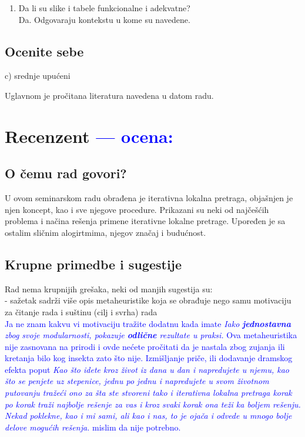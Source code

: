 \documentclass[a4paper]{report}
\newcommand{\odgovor}[1]{\textcolor{blue}{#1}}
\begin{document}
\begin{enumerate}
\item Da li su slike i tabele funkcionalne i adekvatne?\\
Da. Odgovaraju kontekstu u kome su navedene.
\end{enumerate}

\section{Ocenite sebe}
c) srednje upućeni

Uglavnom je pročitana literatura navedena u datom radu.

\chapter{Recenzent \odgovor{--- ocena:} }


\section{O čemu rad govori?}

U ovom seminarskom radu obrađena je iterativna lokalna pretraga, objašnjen je njen koncept, kao i  sve njegove procedure. Prikazani su neki od najčešćih problema i načina rešenja primene iterativne lokalne pretrage. Upoređen je sa ostalim sličnim alogirtmima, njegov značaj i budućnost.

\section{Krupne primedbe i sugestije}

Rad nema krupnijih grešaka, neki od manjih sugestija su:\\
- sažetak sadrži više opis metaheuristike koja se obrađuje nego samu motivaciju za čitanje rada i suštinu (cilj i svrha) rada\\
\odgovor{Ja ne znam kakvu vi motivaciju tražite dodatnu kada imate \textit{Iako \textbf{jednostavna} zbog svoje modularnosti, pokazuje \textbf{odlične} rezultate u praksi.} Ova metaheuristika nije zasnovana na prirodi i ovde nećete pročitati 
da je nastala zbog zujanja ili kretanja bilo kog insekta zato što nije. Izmišljanje priče, ili dodavanje dramskog efekta poput \textit{Kao što idete kroz život iz dana u dan i napredujete u njemu, kao što se penjete uz stepenice, jednu po jednu i napredujete u svom životnom putovanju tražeći ono za šta ste stvoreni tako i iterativna lokalna pretraga korak po korak traži najbolje rešenje za vas i kroz 
svaki korak ona teži ka boljem rešenju. Nekad poklekne, kao i mi sami, ali kao i nas, to je ojača i odvede u mnogo bolje delove mogućih rešenja.} mislim da nije potrebno.\\}
\end{document}

